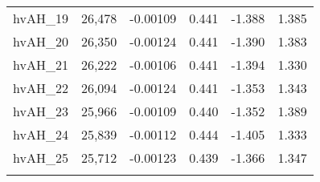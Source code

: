 \begin{tabular}{lccccc}
hvAH\_19 & 26,478 & -0.00109 & 0.441 & -1.388 & 1.385 \\
hvAH\_20 & 26,350 & -0.00124 & 0.441 & -1.390 & 1.383 \\
hvAH\_21 & 26,222 & -0.00106 & 0.441 & -1.394 & 1.330 \\
hvAH\_22 & 26,094 & -0.00124 & 0.441 & -1.353 & 1.343 \\
hvAH\_23 & 25,966 & -0.00109 & 0.440 & -1.352 & 1.389 \\
hvAH\_24 & 25,839 & -0.00112 & 0.444 & -1.405 & 1.333 \\
hvAH\_25 & 25,712 & -0.00123 & 0.439 & -1.366 & 1.347 \\
 &  &  &  &  &  \\ \hline
\end{tabular}
